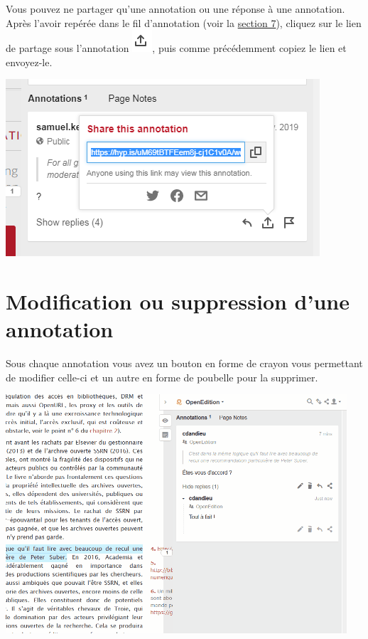 \documentclass[
]{book}
\begin{document}
Vous pouvez ne partager qu'une annotation ou une réponse à une annotation. Après l'avoir repérée dans le fil d'annotation (voir la \protect\hyperlink{s7}{section 7}), cliquez sur le lien de partage sous l'annotation \includegraphics{img/9ed8e6410bcd25e02923bf774a7fb2fe.png}, puis comme précédemment copiez le lien et envoyez-le.

\includegraphics{img/cb6bdc80ca52dfbde7f2cb85ae981643.png}

\hypertarget{s5}{%
\chapter{Modification ou suppression d'une annotation}\label{s5}}

Sous chaque annotation vous avez un bouton en forme de crayon vous permettant de modifier celle-ci et un autre en forme de poubelle pour la supprimer.

\includegraphics{img/523575cc7eaccc9577140afd392b9710.png}
\end{document}
